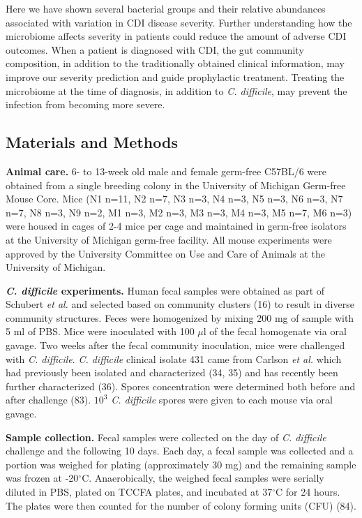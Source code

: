 \documentclass[
  12pt,
]{article}
\begin{document}
Here we have shown several bacterial groups and their relative
abundances associated with variation in CDI disease severity. Further
understanding how the microbiome affects severity in patients could
reduce the amount of adverse CDI outcomes. When a patient is diagnosed
with CDI, the gut community composition, in addition to the
traditionally obtained clinical information, may improve our severity
prediction and guide prophylactic treatment. Treating the microbiome at
the time of diagnosis, in addition to \emph{C. difficile}, may prevent
the infection from becoming more severe.

\hypertarget{materials-and-methods}{%
\subsection{Materials and Methods}\label{materials-and-methods}}

\textbf{Animal care.} 6- to 13-week old male and female germ-free
C57BL/6 were obtained from a single breeding colony in the University of
Michigan Germ-free Mouse Core. Mice (N1 n=11, N2 n=7, N3 n=3, N4 n=3, N5
n=3, N6 n=3, N7 n=7, N8 n=3, N9 n=2, M1 n=3, M2 n=3, M3 n=3, M4 n=3, M5
n=7, M6 n=3) were housed in cages of 2-4 mice per cage and maintained in
germ-free isolators at the University of Michigan germ-free facility.
All mouse experiments were approved by the University Committee on Use
and Care of Animals at the University of Michigan.

\textbf{\emph{C. difficile} experiments.} Human fecal samples were
obtained as part of Schubert \emph{et al.} and selected based on
community clusters (16) to result in diverse community structures. Feces
were homogenized by mixing 200 mg of sample with 5 ml of PBS. Mice were
inoculated with 100 \(\mu\)l of the fecal homogenate via oral gavage.
Two weeks after the fecal community inoculation, mice were challenged
with \emph{C. difficile}. \emph{C. difficile} clinical isolate 431 came
from Carlson \emph{et al.} which had previously been isolated and
characterized (34, 35) and has recently been further characterized (36).
Spores concentration were determined both before and after challenge
(83). \(10^{3}\) \emph{C. difficile} spores were given to each mouse via
oral gavage.

\textbf{Sample collection.} Fecal samples were collected on the day of
\emph{C. difficile} challenge and the following 10 days. Each day, a
fecal sample was collected and a portion was weighed for plating
(approximately 30 mg) and the remaining sample was frozen at
-20\(^\circ\)C. Anaerobically, the weighed fecal samples were serially
diluted in PBS, plated on TCCFA plates, and incubated at 37\(^\circ\)C
for 24 hours. The plates were then counted for the number of colony
forming units (CFU) (84).
\end{document}
